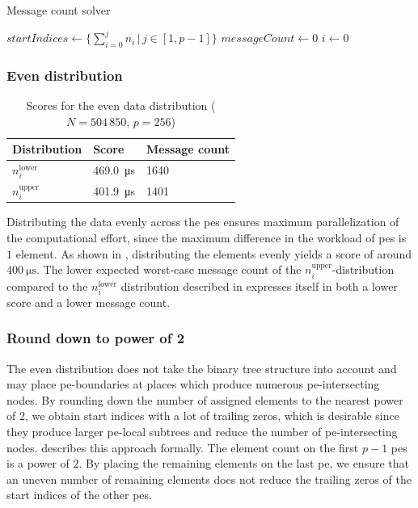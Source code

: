 \begin{algorithm}
\caption{Message count solver}\label{algo:MessageCountSolver}
\DontPrintSemicolon
\SetAlgoLined
$startIndices \gets \{\sum_{i=0}^j n_i \,\big|\, j \in [1, p-1] \}$\;
$messageCount \gets 0$\;
$i \gets 0$\; 
\end{algorithm}



\subsubsection{Even distribution}

\begin{table}
\centering
\begin{tabular}{l|l|l}
Distribution & Score & Message count \\
\hline
$n_i^\textrm{lower}$ & \SI{469.0}{\micro\second} & 1640 \\
$n_i^\textrm{upper}$ & \SI{401.9}{\micro\second} & 1401
\end{tabular}
\caption{Scores for the even data distribution ($N = 504\,850$, $p=256$)}
\label{table:EvenDistributionScores}
\end{table}
Distributing the data evenly across the \glspl{pe} ensures maximum parallelization of the computational effort, since the maximum difference in the workload of \glspl{pe} is $1$ element.
As shown in , distributing the elements evenly yields a score of around $\SI{400}{\micro\second}$.
The lower expected worst-case message count of the $n_i^\textrm{upper}$-distribution compared to the $n_i^\textrm{lower}$ distribution described in  expresses itself in both a lower score and a lower message count.

\subsubsection{Round down to power of 2}
\label{sec:roundDownPower2Distribution}
The even distribution does not take the binary tree structure into account and may place \gls{pe}-boundaries at places which produce numerous \gls{pe}-intersecting nodes.
By rounding down the number of assigned elements to the nearest power of $2$, we obtain start indices with a lot of trailing zeros, which is desirable since they produce larger \gls{pe}-local subtrees and reduce the number of \gls{pe}-intersecting nodes.
 describes this approach formally.
The element count on the first $p - 1$ \glspl{pe} is a power of $2$.
By placing the remaining elements on the last \gls{pe}, we ensure that an uneven number of remaining elements does not reduce the trailing zeros of the start indices of the other \glspl{pe}.

